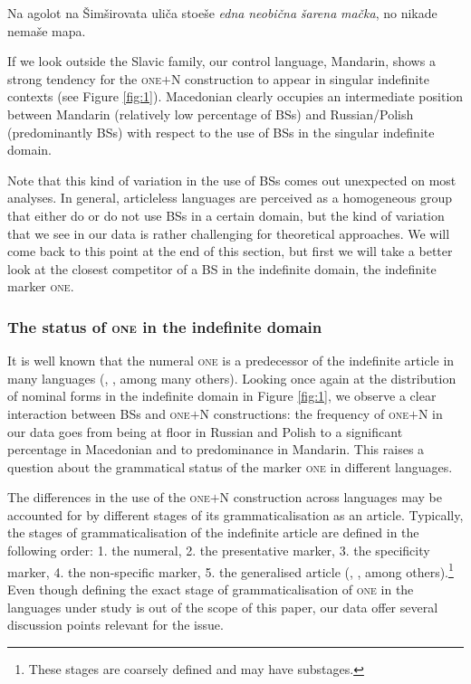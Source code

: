 \documentclass[output=paper,colorlinks,citecolor=brown]{langscibook}
\begin{document}
\ea
 Na agolot na \v{S}im\v{s}irovata uli\v{c}a stoe\v{s}e \textit{edna} \textit{neobi\v{c}na} \textit{\v{s}arena} \textit{ma\v{c}ka}, no nikade nema\v{s}e mapa. \\
\z

\noindent If we look outside the Slavic family, our control language, Mandarin, shows a strong tendency for the \textsc{one}$+$N construction to appear in singular indefinite contexts (see Figure \ref{fig:1}). Macedonian clearly occupies an intermediate position between Mandarin (relatively low percentage of BSs) and Russian/Polish (predominantly BSs) with respect to the use of BSs in the singular indefinite domain. 

Note that this kind of variation in the use of BSs comes out unexpected on most analyses. In general, articleless languages are perceived as a homogeneous group that either do or do not use BSs in a certain domain, but the kind of variation that we see in our data is rather challenging for theoretical approaches. We will come back to this point at the end of this section, but first we will take a better look at the closest competitor of a BS in the indefinite domain, the indefinite marker \textsc{one}.

\subsubsection{The status of \textsc{one} in the indefinite domain}

It is well known that the numeral \textsc{one} is a predecessor of the indefinite article in many languages (\cite{Heine1997}, \cite{Gelderen2011}, among many others). Looking once again at the distribution of nominal forms in the indefinite domain in Figure \ref{fig:1}, we observe a clear interaction between BSs and \textsc{one}$+$N constructions: the frequency of \textsc{one}$+$N in our data goes from being at floor in Russian and Polish to a significant percentage in Macedonian and to predominance in Mandarin. This raises a question about the grammatical status of the marker \textsc{one} in different languages. 

The differences in the use of the \textsc{one}$+$N construction across languages may be accounted for by different stages of its grammaticalisation as an article. Typically, the stages of grammaticalisation of the indefinite article are defined in the following order: 1. the numeral, 2. the presentative marker, 3. the specificity marker, 4. the non-specific marker, 5. the generalised article (\citealt{Givon1981}, \citealt{Heine1997}, among others).\footnote{These stages are coarsely defined and may have substages.} Even though defining the exact stage of grammaticalisation of \textsc{one} in the languages under study is out of the scope of this paper, our data offer several discussion points relevant for the issue.   
\end{document}
